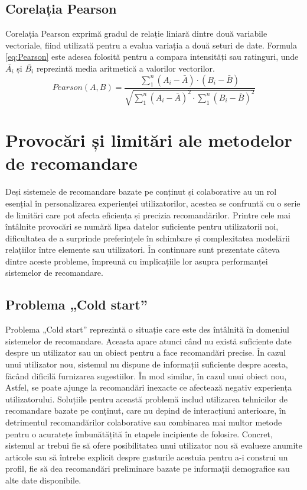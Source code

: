 \subsection{Corelația Pearson}
\label{subsec:ch3sec3sub3}
Corelația Pearson \cite{al2018similarity} exprimă gradul de relație liniară dintre două variabile vectoriale, fiind utilizată pentru a evalua variația a două seturi de date.
Formula \ref{eq:Pearson} este adesea folosită pentru a compara intensități sau ratinguri, unde \(\bar{A_i}\) și \(\bar{B_i}\) reprezintă media aritmetică a valorilor vectorilor.
\begin{equation}
    Pearson(A, B) = \frac{\sum_1^n (A_i - \bar{A}) \cdot (B_i - \bar{B})}{\sqrt{\sum_1^n (A_i - \bar{A})^2 \cdot \sum_1^n (B_i - \bar{B})^2}}
    \label{eq:Pearson}
\end{equation}


\section{Provocări și limitări ale metodelor de recomandare}
\label{sec:ch3sec4}
Deși sistemele de recomandare bazate pe conținut și colaborative au un rol esențial în personalizarea experienței utilizatorilor, acestea se confruntă cu o serie de limitări care pot afecta eficiența și precizia recomandărilor. 
Printre cele mai întâlnite provocări se numără lipsa datelor suficiente pentru utilizatorii noi, dificultatea de a surprinde preferințele în schimbare și complexitatea modelării relațiilor între elemente sau utilizatori. 
În continuare sunt prezentate câteva dintre aceste probleme, împreună cu implicațiile lor asupra performanței sistemelor de recomandare.

\subsection{Problema „Cold start”}
\label{subsec:ch3sec4sub1}
Problema „Cold start”\cite{lika2014facing} reprezintă o situație care este des întâlnită în domeniul sistemelor de recomandare. 
Aceasta apare atunci când nu există suficiente date despre un utilizator sau un obiect pentru a face recomandări precise.
În cazul unui utilizator nou, sistemul nu dispune de informații suficiente despre acesta, făcând dificilă furnizarea sugestiilor.
În mod similar, în cazul unui obiect nou, 
Astfel, se poate ajunge la recomandări inexacte ce afectează negativ experiența utilizatorului.
Soluțiile pentru această problemă includ utilizarea tehnicilor de recomandare bazate pe conținut, care nu depind de interacțiuni anterioare, 
în detrimentul recomandărilor colaborative sau combinarea mai multor metode pentru o acuratețe îmbunătățită în etapele incipiente de folosire.
Concret, sistemul ar trebui fie să ofere posibilitatea unui utilizator nou să evalueze anumite articole sau să întrebe explicit despre gusturile acestuia pentru a-i construi un profil, 
fie să dea recomandări preliminare bazate pe informații demografice sau alte date disponibile\cite{kumar2018recommendation}.


